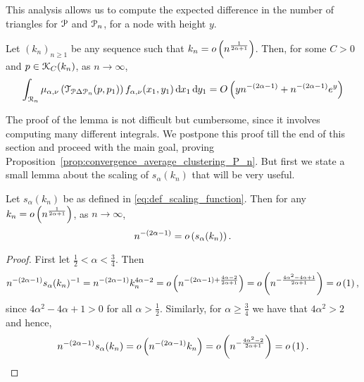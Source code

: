 This analysis allows us to compute the expected difference in the number of triangles for ${\mathcal P}$ and ${\mathcal P}_n$, for a node with height $y$. 

\begin{lemma}\label{lem:clustering_error_T_term}
Let $(k_n)_{n \ge 1}$ be any sequence such that $k_n = o\left(n^{\frac{1}{2\alpha + 1}}\right)$. Then, for some $C > 0$ and $p \in {\mathcal K}_{C}(k_n)$, as $n \to \infty$,
\[
	\int_{{\mathcal R}_n} \mu_{\alpha, \nu}\left(\mathcal{T}_{{\mathcal P} \Delta {\mathcal P}_n}(p,p_1)\right) f_{\alpha, \nu}(x_1,y_1) 
	\operatorname{\mathrm{d}\hspace{-2pt}} x_1 \operatorname{\mathrm{d}\hspace{-2pt}} y_1 = O\left(y n^{-(2\alpha - 1)} + n^{-(2\alpha-1)} e^{y}\right)
\]
\end{lemma}

The proof of the lemma is not difficult but cumbersome, since it involves computing many different integrals. We postpone this proof till the end of this section and proceed with the main goal, proving Proposition~\ref{prop:convergence_average_clustering_P_n}. But first we state a small lemma about the scaling of $s_\alpha(k_n)$ that will be very useful.  

\begin{lemma}\label{lem:scaling_s_alpha}
Let $s_\alpha(k_n)$ be as defined in \eqref{eq:def_scaling_function}. Then for any $k_n = o\left(n^{\frac{1}{2\alpha + 1}}\right)$, as $n \to \infty$,
\[
	n^{-(2\alpha - 1)} = o\left(s_\alpha(k_n)\right).
\]
\end{lemma}

\begin{proof}
First let $\frac{1}{2} < \alpha < \frac{3}{4}$. Then
\[
	n^{-(2\alpha - 1)}s_\alpha(k_n)^{-1} = n^{-(2\alpha -1)}k_n^{4\alpha - 2}
	= o\left(n^{-(2\alpha - 1) + \frac{4\alpha - 2}{2\alpha + 1}}\right) 
	= o\left(n^{-\frac{4\alpha^2 - 4\alpha + 1}{2\alpha + 1}}\right)
	= o\left(1\right),
\]
since $4\alpha^2 - 4\alpha + 1 > 0$ for all $\alpha > \frac{1}{2}$. Similarly, for $\alpha \ge \frac{3}{4}$ we have
that $4\alpha^2 > 2$ and hence,
\[
	n^{-(2\alpha - 1)} s_{\alpha}(k_n) = o\left(n^{-(2\alpha - 1)} k_n\right) = o\left(n^{-\frac{4\alpha^2 - 2}{2\alpha + 1}}\right)
	= o\left(1\right).
\]
\end{proof}

